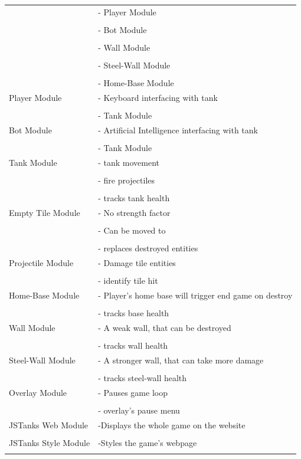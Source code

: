 \documentclass{article}
\begin{document}
\begin{tabularx}{\textwidth}{l X}
	 & - Player Module\\ \\
	 & - Bot Module\\ \\
	 & - Wall Module\\ \\
	 & - Steel-Wall Module\\ \\
	 & - Home-Base Module\\
	  \midrule
	 Player Module & - Keyboard interfacing with tank\\ \\
	 & - Tank Module\\
	   \midrule
	 Bot Module & - Artificial Intelligence interfacing  with tank\\ \\
	 & - Tank Module\\
	 \midrule
	 Tank Module & - tank movement \\ \\
	 & - fire projectiles\\ \\
	 & - tracks tank health\\
	   \midrule
	 Empty Tile Module & - No strength factor \\ \\
	  & - Can be moved to\\ \\
	  & - replaces destroyed entities\\
	    \midrule
	 Projectile Module & - Damage tile entities \\ \\
	 & - identify tile hit\\
	  \midrule
	 Home-Base Module & - Player's home base will trigger end game on destroy \\ \\
	 & - tracks base health\\
	 \midrule 
	 Wall Module & - A weak wall, that can be destroyed \\ \\
	 & - tracks wall health\\
	 \midrule
	 Steel-Wall Module & - A stronger wall, that can take more damage \\ \\
	 & - tracks steel-wall health\\
	  \midrule
	 Overlay Module & - Pauses game loop \\ \\
	 & - overlay's pause menu\\
	\midrule
	JSTanks Web Module & -Displays the whole game on the website\\ \\
	\midrule
	JSTanks Style Module & -Styles the game's webpage\\ \\

\end{tabularx}
\end{document}
